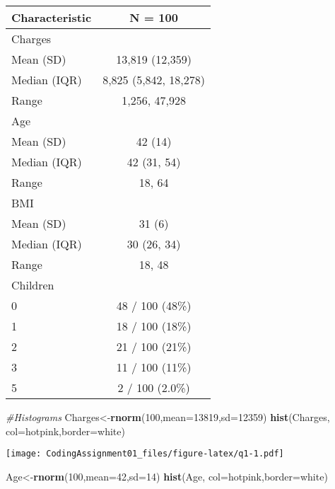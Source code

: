 \documentclass[
]{article}
\newenvironment{Shaded}{\begin{snugshade}}{\end{snugshade}}
\newcommand{\AttributeTok}[1]{\textcolor[rgb]{0.13,0.29,0.53}{#1}}
\newcommand{\CommentTok}[1]{\textcolor[rgb]{0.56,0.35,0.01}{\textit{#1}}}
\newcommand{\DecValTok}[1]{\textcolor[rgb]{0.00,0.00,0.81}{#1}}
\newcommand{\FunctionTok}[1]{\textcolor[rgb]{0.13,0.29,0.53}{\textbf{#1}}}
\newcommand{\NormalTok}[1]{#1}
\newcommand{\OtherTok}[1]{\textcolor[rgb]{0.56,0.35,0.01}{#1}}
\newcommand{\StringTok}[1]{\textcolor[rgb]{0.31,0.60,0.02}{#1}}
\begin{document}
\begin{longtable}[]{@{}lc@{}}
\toprule\noalign{}
\textbf{Characteristic} & \textbf{N = 100} \\
\midrule\noalign{}
\endhead
\bottomrule\noalign{}
\endlastfoot
Charges & \\
Mean (SD) & 13,819 (12,359) \\
Median (IQR) & 8,825 (5,842, 18,278) \\
Range & 1,256, 47,928 \\
Age & \\
Mean (SD) & 42 (14) \\
Median (IQR) & 42 (31, 54) \\
Range & 18, 64 \\
BMI & \\
Mean (SD) & 31 (6) \\
Median (IQR) & 30 (26, 34) \\
Range & 18, 48 \\
Children & \\
0 & 48 / 100 (48\%) \\
1 & 18 / 100 (18\%) \\
2 & 21 / 100 (21\%) \\
3 & 11 / 100 (11\%) \\
5 & 2 / 100 (2.0\%) \\
\end{longtable}

\begin{Shaded}
\begin{Highlighting}[]
\CommentTok{\#Histograms}
\NormalTok{Charges}\OtherTok{\textless{}{-}}\FunctionTok{rnorm}\NormalTok{(}\DecValTok{100}\NormalTok{,}\AttributeTok{mean=}\DecValTok{13819}\NormalTok{,}\AttributeTok{sd=}\DecValTok{12359}\NormalTok{)}
\FunctionTok{hist}\NormalTok{(Charges, }\AttributeTok{col=}\StringTok{\textquotesingle{}hotpink\textquotesingle{}}\NormalTok{,}\AttributeTok{border=}\StringTok{\textquotesingle{}white\textquotesingle{}}\NormalTok{)}
\end{Highlighting}
\end{Shaded}

\texttt{[image: CodingAssignment01\_files/figure-latex/q1-1.pdf]}

\begin{Shaded}
\begin{Highlighting}[]
\NormalTok{Age}\OtherTok{\textless{}{-}}\FunctionTok{rnorm}\NormalTok{(}\DecValTok{100}\NormalTok{,}\AttributeTok{mean=}\DecValTok{42}\NormalTok{,}\AttributeTok{sd=}\DecValTok{14}\NormalTok{)}
\FunctionTok{hist}\NormalTok{(Age, }\AttributeTok{col=}\StringTok{\textquotesingle{}hotpink\textquotesingle{}}\NormalTok{,}\AttributeTok{border=}\StringTok{\textquotesingle{}white\textquotesingle{}}\NormalTok{)}
\end{Highlighting}
\end{Shaded}
\end{document}
